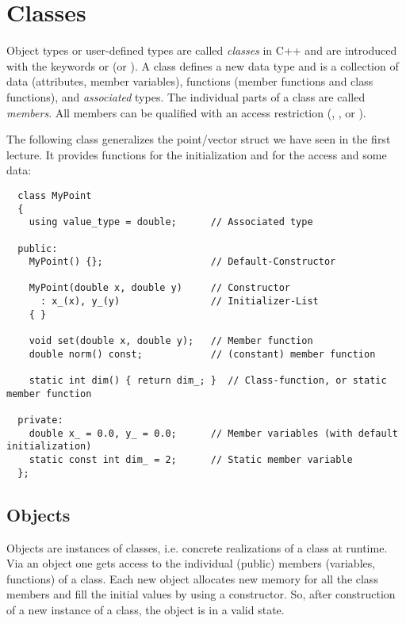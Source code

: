 \chapter{Classes\label{sec:class}}
Object types or user-defined types are called \emph{classes} in C++ and are introduced with the keywords  or  (or ).
A class defines a new data type and is a collection of data (attributes, member variables), functions (member functions and class functions),
and \textit{associated} types. The individual parts of a class are called \emph{members}. All members can be qualified with an access restriction
(, , or ).

\begin{example}
The following class generalizes the point/vector struct we have seen in the first lecture. It provides functions for the initialization and for
the access and some data:
\end{example}
\begin{verbatim}
  class MyPoint
  {
    using value_type = double;      // Associated type

  public:
    MyPoint() {};                   // Default-Constructor

    MyPoint(double x, double y)     // Constructor
      : x_(x), y_(y)                // Initializer-List
    { }

    void set(double x, double y);   // Member function
    double norm() const;            // (constant) member function

    static int dim() { return dim_; }  // Class-function, or static member function

  private:
    double x_ = 0.0, y_ = 0.0;      // Member variables (with default initialization)
    static const int dim_ = 2;      // Static member variable
  };
\end{verbatim}


\section{Objects\label{sec:class-object}}
Objects are instances of classes, i.e. concrete realizations of a class at runtime. Via an object one gets access to the individual (public) members
(variables, functions) of a class. Each new object allocates new memory for all the class members and fill the initial values by using a constructor.
So, after construction of a new instance of a class, the object is in a valid state.

